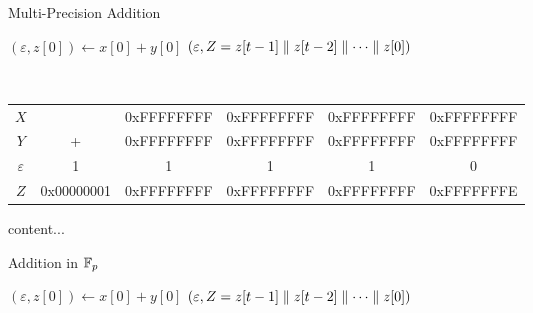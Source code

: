 \begin{algorithm}[H]
	\DontPrintSemicolon
	\caption{Multi-Precision Addition}
	\BlankLine
	$(\varepsilon,z[0])\gets x[0]+y[0]$\;
	\Return $(\varepsilon, Z=z[t-1]\parallel z[t-2]\parallel\cdots\parallel z[0])$\;
\end{algorithm}
\begin{example}
\ \begin{table}[h!]\centering\renewcommand{\arraystretch}{1.25}
	{\ttfamily\begin{tabular*}{\textwidth}{@{\extracolsep{\fill}}cccccc}
	$X$ & & 0xFFFFFFFF & 0xFFFFFFFF & 0xFFFFFFFF & 0xFFFFFFFF \\
	$Y$ & + & 0xFFFFFFFF & 0xFFFFFFFF & 0xFFFFFFFF & 0xFFFFFFFF \\
	$\varepsilon$ & 1 & 1 & 1 & 1 & 0 \\ \cline{2-6}
	$Z$ & 0x00000001 & 0xFFFFFFFF & 0xFFFFFFFF & 0xFFFFFFFF & 0xFFFFFFFE \\
	\end{tabular*}}
\end{table}
\end{example}

\begin{note}
	content...
\end{note}

\begin{algorithm}[H]
	\DontPrintSemicolon
	\caption{Addition in $\mathbb{F}_p$}
	\BlankLine
	$(\varepsilon,z[0])\gets x[0]+y[0]$\;
	\Return $(\varepsilon, Z=z[t-1]\parallel z[t-2]\parallel\cdots\parallel z[0])$\;
\end{algorithm}


